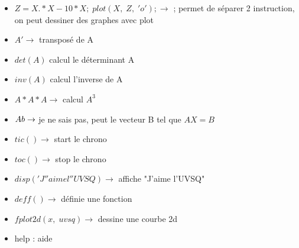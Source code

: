 \documentclass[12pt, letterpaper]{article}
\begin{document}
\begin{itemize}
\item $Z = X.*X-10*X; \; plot(X, \; Z, \; 'o'); \rightarrow$ ; permet de séparer 2 instruction, on peut dessiner des graphes avec plot
\item $A' \rightarrow$ transposé de A
\item $det(A)$ calcul le déterminant A
\item $inv(A)$ calcul l'inverse de A
\item $A*A*A \rightarrow$ calcul $A^3$
\item $A\\b \rightarrow$ je ne sais pas, peut le vecteur B tel que $AX = B$
\item $tic() \rightarrow$ start le chrono
\item $toc() \rightarrow$ stop le chrono
\item $disp('J''aime l''UVSQ) \rightarrow$ affiche "J'aime l'UVSQ"
\item $deff() \rightarrow$ définie une fonction
\item $fplot2d(x, \; uvsq) \rightarrow$ dessine une courbe 2d
  \item help : aide
\end{itemize}
\end{document}
